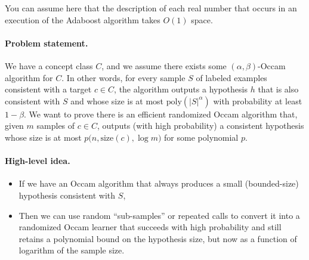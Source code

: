 \documentclass[11pt]{article}
\DeclareMathOperator{\1}{\mathbbm{1}}
\begin{document}
\begin{hint}
    You can assume here that the description of each real number that occurs in an execution of the Adaboost algorithm takes $O(1)$ space.
\end{hint}

\noindent

\paragraph{Problem statement.}
We have a concept class $C$, and we assume there exists some $(\alpha,\beta)$-Occam algorithm for $C$. In other words, for every sample $S$ of labeled examples consistent with a target $c \in C$, the algorithm outputs a hypothesis $h$ that is also consistent with $S$ and whose size is at most $\text{poly}(\lvert S\rvert^\alpha)$ with probability at least $1-\beta$. We want to prove there is an efficient randomized Occam algorithm that, given $m$ samples of $c \in C$, outputs (with high probability) a consistent hypothesis whose size is at most $p\bigl(n,\text{size}(c),\log m\bigr)$ for some polynomial $p$.

\paragraph{High-level idea.}
\begin{itemize}
	\item If we have an Occam algorithm that always produces a small (bounded-size) hypothesis consistent with $S$,
	\item Then we can use random “sub-samples” or repeated calls to convert it into a randomized Occam learner that succeeds with high probability and still retains a polynomial bound on the hypothesis size, but now as a function of logarithm of the sample size.
\end{itemize}
\end{document}
